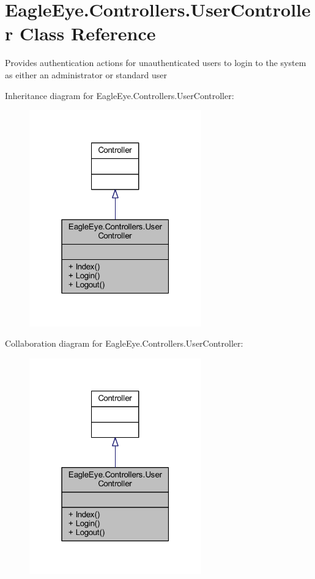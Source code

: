 \hypertarget{class_eagle_eye_1_1_controllers_1_1_user_controller}{}\section{Eagle\+Eye.\+Controllers.\+User\+Controller Class Reference}
\label{class_eagle_eye_1_1_controllers_1_1_user_controller}


Provides authentication actions for unauthenticated users to login to the system as either an administrator or standard user  




Inheritance diagram for Eagle\+Eye.\+Controllers.\+User\+Controller\+:
\nopagebreak
\begin{figure}[H]
\begin{center}
\leavevmode
\includegraphics[width=211pt]{class_eagle_eye_1_1_controllers_1_1_user_controller__inherit__graph}
\end{center}
\end{figure}


Collaboration diagram for Eagle\+Eye.\+Controllers.\+User\+Controller\+:
\nopagebreak
\begin{figure}[H]
\begin{center}
\leavevmode
\includegraphics[width=211pt]{class_eagle_eye_1_1_controllers_1_1_user_controller__coll__graph}
\end{center}
\end{figure}

